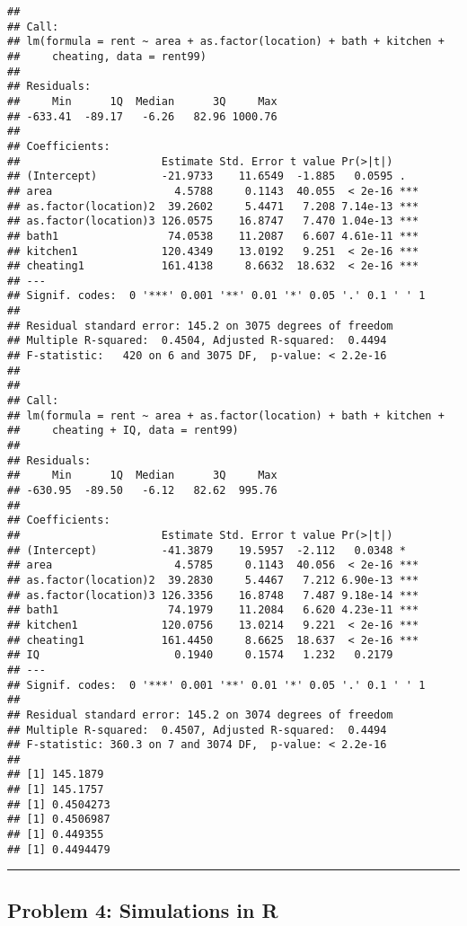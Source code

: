 \documentclass[]{article}
\begin{document}
\begin{verbatim}
## 
## Call:
## lm(formula = rent ~ area + as.factor(location) + bath + kitchen + 
##     cheating, data = rent99)
## 
## Residuals:
##     Min      1Q  Median      3Q     Max 
## -633.41  -89.17   -6.26   82.96 1000.76 
## 
## Coefficients:
##                      Estimate Std. Error t value Pr(>|t|)    
## (Intercept)          -21.9733    11.6549  -1.885   0.0595 .  
## area                   4.5788     0.1143  40.055  < 2e-16 ***
## as.factor(location)2  39.2602     5.4471   7.208 7.14e-13 ***
## as.factor(location)3 126.0575    16.8747   7.470 1.04e-13 ***
## bath1                 74.0538    11.2087   6.607 4.61e-11 ***
## kitchen1             120.4349    13.0192   9.251  < 2e-16 ***
## cheating1            161.4138     8.6632  18.632  < 2e-16 ***
## ---
## Signif. codes:  0 '***' 0.001 '**' 0.01 '*' 0.05 '.' 0.1 ' ' 1
## 
## Residual standard error: 145.2 on 3075 degrees of freedom
## Multiple R-squared:  0.4504, Adjusted R-squared:  0.4494 
## F-statistic:   420 on 6 and 3075 DF,  p-value: < 2.2e-16
## 
## 
## Call:
## lm(formula = rent ~ area + as.factor(location) + bath + kitchen + 
##     cheating + IQ, data = rent99)
## 
## Residuals:
##     Min      1Q  Median      3Q     Max 
## -630.95  -89.50   -6.12   82.62  995.76 
## 
## Coefficients:
##                      Estimate Std. Error t value Pr(>|t|)    
## (Intercept)          -41.3879    19.5957  -2.112   0.0348 *  
## area                   4.5785     0.1143  40.056  < 2e-16 ***
## as.factor(location)2  39.2830     5.4467   7.212 6.90e-13 ***
## as.factor(location)3 126.3356    16.8748   7.487 9.18e-14 ***
## bath1                 74.1979    11.2084   6.620 4.23e-11 ***
## kitchen1             120.0756    13.0214   9.221  < 2e-16 ***
## cheating1            161.4450     8.6625  18.637  < 2e-16 ***
## IQ                     0.1940     0.1574   1.232   0.2179    
## ---
## Signif. codes:  0 '***' 0.001 '**' 0.01 '*' 0.05 '.' 0.1 ' ' 1
## 
## Residual standard error: 145.2 on 3074 degrees of freedom
## Multiple R-squared:  0.4507, Adjusted R-squared:  0.4494 
## F-statistic: 360.3 on 7 and 3074 DF,  p-value: < 2.2e-16
## 
## [1] 145.1879
## [1] 145.1757
## [1] 0.4504273
## [1] 0.4506987
## [1] 0.449355
## [1] 0.4494479
\end{verbatim}

\begin{center}\rule{0.5\linewidth}{\linethickness}\end{center}

\subsection{Problem 4: Simulations in
R}\label{problem-4-simulations-in-r}
\end{document}
